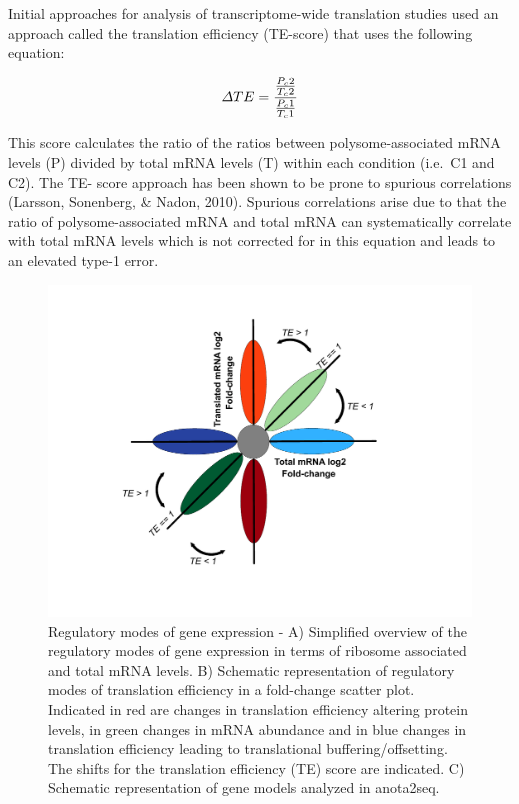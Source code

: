 \documentclass[12pt,openany]{book}
\begin{document}
Initial approaches for analysis of transcriptome-wide translation
studies used an approach called the translation efficiency (TE-score)
that uses the following equation:

\[\varDelta TE = \frac{\frac{P_c2}{T_c2}} {\frac{P_c1}{T_c1}}\\\]

This score calculates the ratio of the ratios between
polysome-associated mRNA levels (P) divided by total mRNA levels (T)
within each condition (i.e.~C1 and C2). The TE- score approach has been
shown to be prone to spurious correlations (Larsson, Sonenberg, \&
Nadon, 2010). Spurious correlations arise due to that the ratio of
polysome-associated mRNA and total mRNA can systematically correlate
with total mRNA levels which is not corrected for in this equation and
leads to an elevated type-1 error.

\begin{figure}
  \includegraphics{./figures/geneModes_TE.pdf}
  \caption{Regulatory modes of gene expression - A) Simplified overview of the regulatory modes of gene expression in terms of ribosome associated and total mRNA levels. B) Schematic representation of regulatory modes of translation efficiency in a fold-change scatter plot. Indicated in red are changes in translation efficiency altering protein levels, in green changes in mRNA abundance and in blue changes in translation efficiency leading to translational buffering/offsetting. The shifts for the translation efficiency (TE) score are indicated. C) Schematic representation of gene models analyzed in anota2seq. \label{fig:TE}}
\end{figure}
\end{document}
